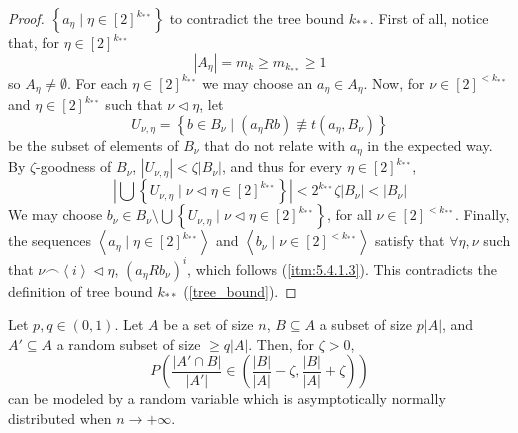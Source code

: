 \begin{proof}
            $\left\{ a_\eta \mid \eta \in [2]^{k_{**}} \right\}$ to contradict the tree bound $k_{**}$.
            First of all, notice that, for $\eta \in [2]^{k_{**}}$
            $$
                |A_\eta| = m_k \geq m_{k_{**}} \geq 1
            $$
            so $A_\eta \neq \emptyset$.
            For each $\eta \in [2]^{k_{**}}$ we may choose an $a_\eta \in A_\eta$.
            Now, for $\nu \in [2]^{<k_{**}}$ and $\eta \in [2]^{k_{**}}$ such that $\nu \triangleleft \eta$, let
            $$
                U_{\nu,\eta} = \left\{ b \in B_\nu \mid (a_\eta R b) \not\equiv t(a_\eta, B_\nu) \right\}
            $$
            be the subset of elements of $B_\nu$ that do not relate with $a_\eta$ in the expected way.
            By $\zeta$-goodness of $B_\nu$, $|U_{\nu, \eta}| < \zeta |B_\nu|$, and thus for every $\eta \in [2]^{k_{**}}$,
            $$
                \left|\bigcup\left\{ U_{\nu,\eta} \mid \nu \triangleleft \eta \in [2]^{k_{**}} \right\}\right| <
                2^{k_{**}} \zeta |B_\nu| < |B_\nu|
            $$
            We may choose $b_\nu \in B_\nu \setminus \bigcup\left\{ U_{\nu,\eta} \mid \nu \triangleleft \eta \in [2]^{k_{**}} \right\}$,
            for all $\nu \in [2]^{<k_{**}}$.
            Finally, the sequences $\left< a_\eta \mid \eta \in [2]^{k_{**}} \right>$ and
            $\left< b_\nu \mid \nu \in [2]^{<k_{**}} \right>$ satisfy that $\forall \eta, \nu$ such that
            $\nu \frown \left< i \right> \triangleleft \eta$, $\left( a_\eta R b_\nu \right)^i$, which follows
            (\ref{itm:5.4.1.3}).
            This contradicts the definition of tree bound $k_{**}$ (\ref{tree_bound}).
        \end{proof}

    \lemma[Fact 5.9]\label{fact_5.9}
        Let $p,q \in \left( 0,1 \right)$.
        Let $A$ be a set of size $n$, $B \subseteq A$ a subset of size $p|A|$, and $A' \subseteq A$ a random subset
        of size $\geq q|A|$. %
        Then, for $\zeta > 0$,
        $$
            P\left( \frac{\left| A' \cap B \right|}{\left| A' \right|} \in
                 \left( \frac{\left| B \right|}{\left| A \right|} -
                 \zeta, \frac{\left| B \right|}{\left| A \right|} + \zeta \right) \right)
        $$
        can be modeled by a random variable which is asymptotically normally distributed when $n \to +\infty$.

